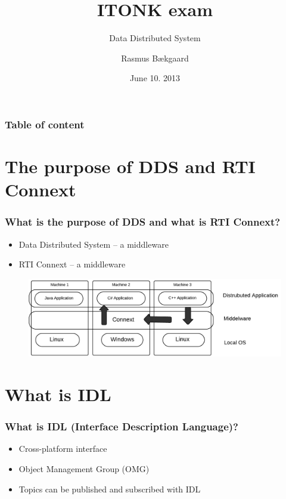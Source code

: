 \documentclass{beamer}
\title{ITONK exam}
\subtitle{Data Distributed System}
\author %
{Rasmus Bækgaard\inst{1}}
\institute%
{
  \inst{1}%
  Information and Communication Technology\\
  Aarhus University, School of Engineering
}
\date{June 10. 2013}
\begin{document}
	\frame{\titlepage}
	
	\begin{frame}
		\frametitle{Table of content}
		\tableofcontents%
	\end{frame}

\section{The purpose of DDS and RTI Connext}
	\begin{frame}
		\frametitle{What is the purpose of DDS and what is RTI Connext?}
		
		\begin{itemize}
		\item Data Distributed System -- a middleware
		\item RTI Connext -- a middleware 
		\end{itemize}
		
		\begin{figure}[hbtp]
		\centering
		\includegraphics[scale=0.35]{MiddelwareImplementation}
		\end{figure}
				
	\end{frame}
		
	
\section{What is IDL}
	\begin{frame}
		\frametitle{What is IDL (Interface Description Language)?}
		
		\begin{itemize}
		\item Cross-platform interface
		\item Object Management Group (OMG)
		\item Topics can be published and subscribed with IDL
		
		\end{itemize}
		
	\end{frame}
	
\end{document}
